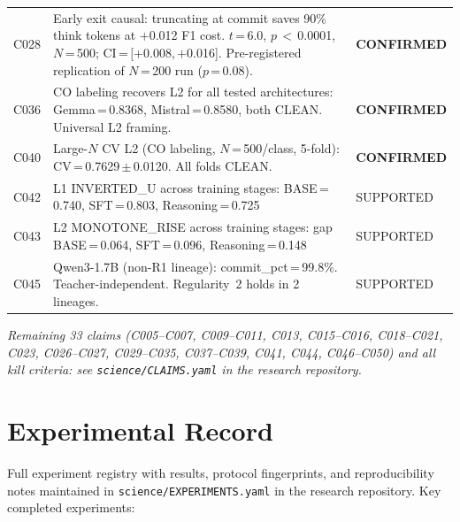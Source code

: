 \documentclass[11pt]{article}
\newcommand{\code}[1]{\texttt{\small #1}}
\begin{document}
\begin{table}[h!]
\begin{tabular}{cL{8.5cm}l}
C028 & Early exit causal: truncating at commit saves 90\% think tokens at $+$0.012 F1 cost. $t$\,=\,6.0, $p$\,$<$\,0.0001, $N$\,=\,500; CI\,=\,$[$+$0.008, +$0.016]. Pre-registered replication of $N$\,=\,200 run ($p$\,=\,0.08). & \textbf{CONFIRMED} \\
C036 & CO labeling recovers L2 for all tested architectures: Gemma\,=\,0.8368, Mistral\,=\,0.8580, both CLEAN. Universal L2 framing. & \textbf{CONFIRMED} \\
C040 & Large-$N$ CV L2 (CO labeling, $N$\,=\,500/class, 5-fold): CV\,=\,0.7629\,$\pm$\,0.0120. All folds CLEAN. & \textbf{CONFIRMED} \\
C042 & L1 INVERTED\_U across training stages: BASE\,=\,0.740, SFT\,=\,0.803, Reasoning\,=\,0.725 & SUPPORTED \\
C043 & L2 MONOTONE\_RISE across training stages: gap BASE\,=\,0.064, SFT\,=\,0.096, Reasoning\,=\,0.148 & SUPPORTED \\
C045 & Qwen3-1.7B (non-R1 lineage): commit\_pct\,=\,99.8\%. Teacher-independent. Regularity~2 holds in 2 lineages. & SUPPORTED \\
\bottomrule
\end{tabular}
\end{table}

\noindent\small\textit{Remaining 33 claims (C005--C007, C009--C011, C013, C015--C016, C018--C021,
C023, C026--C027, C029--C035, C037--C039, C041, C044, C046--C050) and all kill criteria: see
\texttt{science/CLAIMS.yaml} in the research repository.}

\section{Experimental Record}
\label{app:experiments}

Full experiment registry with results, protocol fingerprints, and reproducibility notes
maintained in \code{science/EXPERIMENTS.yaml} in the research repository. Key completed
experiments:
\end{document}

